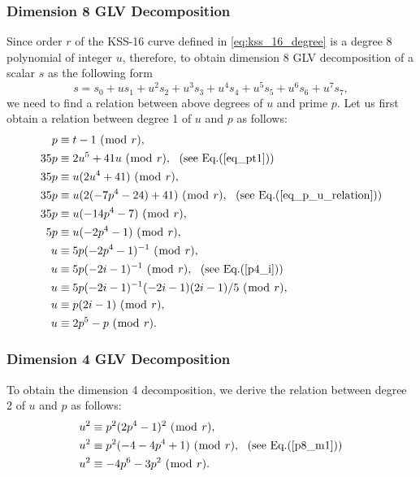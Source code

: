 \subsubsection{Dimension 8 GLV Decomposition}
Since order $r$ of  the KSS-16 curve defined in \eqref{eq:kss_16_degree} is a degree 8 polynomial of integer $u$, therefore, to obtain dimension 8 GLV decomposition of a scalar $s$ as the following form
\begin{equation}
 s = s_0 + u s_1 + u^2 s_2 + u^3 s_3 + u^4 s_4 + u^5 s_5 + u^6 s_6 + u^7 s_7, \nonumber
\end{equation}
we need to find a relation between above degrees of $u$ and prime $p$. 
Let us first obtain a relation between degree 1 of $u$ and $p$ as follows:
\begin{alignat}{3}
p &\equiv t-1~(\bmod~r), \nonumber \\
35p &\equiv 2u^5+41u~(\bmod~r), ~~(\text{see~Eq.}(\ref{eq_pt1}))\nonumber \\
35p &\equiv u(2u^4+41)~(\bmod~r), \nonumber \\
35p &\equiv u(2(-7p^4-24)+41)~(\bmod~r), ~~(\text{see~Eq.}(\ref{eq_p_u_relation})) \nonumber \\
35p &\equiv u(-14p^4-7)~(\bmod~r), \nonumber \\
5p &\equiv u(-2p^4-1)~(\bmod~r), \nonumber \\
u &\equiv 5p(-2p^4-1)^{-1}~(\bmod~r), \nonumber \\
u &\equiv 5p(-2i-1)^{-1}~(\bmod~r), ~~(\text{see~Eq.}(\ref{p4_i})) \nonumber \\
u &\equiv 5p(-2i-1)^{-1}(-2i-1)(2i-1)/5~(\bmod~r), \nonumber \\
u &\equiv p(2i-1)~(\bmod~r), \nonumber \\
u &\equiv 2p^5-p~(\bmod~r). \label{equ} 
\end{alignat}

\subsubsection{Dimension 4 GLV Decomposition}
To obtain the dimension 4 decomposition, we derive the relation between degree 2 of $u$ and $p$ as follows:
\begin {alignat}{3}
u^2 &\equiv p^2(2p^4-1)^2~(\bmod~r), \nonumber \\
u^2 &\equiv p^2(-4-4p^4+1)~(\bmod~r),  ~~(\text{see~Eq.}(\ref{p8_m1})) \nonumber \\
u^2 &\equiv -4p^6-3p^2~(\bmod~r). \label{equ2}
\end{alignat}


